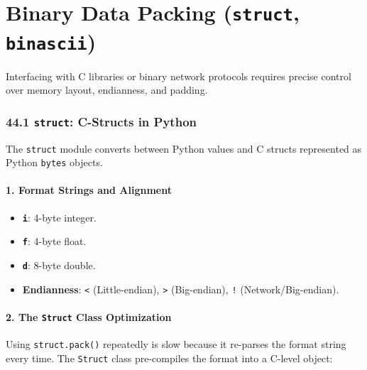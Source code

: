 \hypertarget{binary-data-packing-struct-binascii}{%
\chapter{\texorpdfstring{Binary Data Packing (\texttt{struct},
\texttt{binascii})}{Binary Data Packing (struct, binascii)}}\label{binary-data-packing-struct-binascii}}

Interfacing with C libraries or binary network protocols requires
precise control over memory layout, endianness, and padding.

\hypertarget{struct-c-structs-in-python}{%
\subsection{\texorpdfstring{44.1 \texttt{struct}: C-Structs in
Python}{44.1 struct: C-Structs in Python}}\label{struct-c-structs-in-python}}

The \passthrough{\lstinline!struct!} module converts between Python
values and C structs represented as Python
\passthrough{\lstinline!bytes!} objects.

\hypertarget{format-strings-and-alignment}{%
\subsubsection{1. Format Strings and
Alignment}\label{format-strings-and-alignment}}

\begin{itemize}
\tightlist
\item
  \textbf{\passthrough{\lstinline!i!}}: 4-byte integer.
\item
  \textbf{\passthrough{\lstinline!f!}}: 4-byte float.
\item
  \textbf{\passthrough{\lstinline!d!}}: 8-byte double.
\item
  \textbf{Endianness}: \passthrough{\lstinline!<!} (Little-endian),
  \passthrough{\lstinline!>!} (Big-endian), \passthrough{\lstinline"!"}
  (Network/Big-endian).
\end{itemize}

\hypertarget{the-struct-class-optimization}{%
\subsubsection{\texorpdfstring{2. The \texttt{Struct} Class
Optimization}{2. The Struct Class Optimization}}\label{the-struct-class-optimization}}

Using \passthrough{\lstinline!struct.pack()!} repeatedly is slow because
it re-parses the format string every time. The
\passthrough{\lstinline!Struct!} class pre-compiles the format into a
C-level object:

